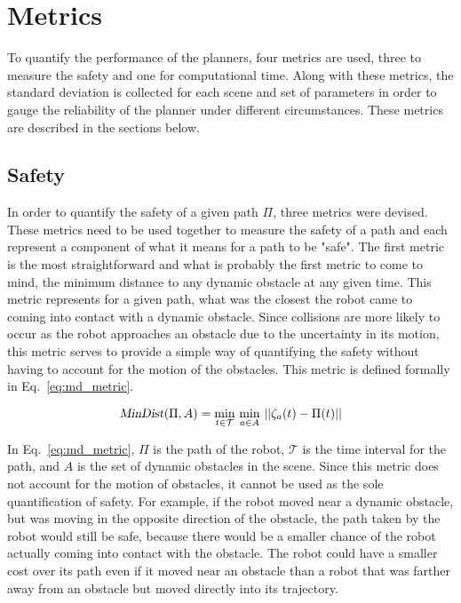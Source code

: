 \section{Metrics}

To quantify the performance of the planners, four metrics are used, three to
measure the safety and one for computational time. Along with these metrics,
the standard deviation is collected for each scene and set of parameters in
order to gauge the reliability of the planner under different circumstances.
These metrics are described in the sections below.

\subsection{Safety}

In order to quantify the safety of a given path $\Pi$, three metrics were
devised. These metrics need to be used together to measure the safety of a path
and each represent a component of what it means for a path to be "safe". The
first metric is the most straightforward and what is probably the first metric
to come to mind, the minimum distance to any dynamic obstacle at any given
time. This metric represents for a given path, what was the closest the robot
came to coming into contact with a dynamic obstacle. Since collisions are more
likely to occur as the robot approaches an obstacle due to the uncertainty in
its motion, this metric serves to provide a simple way of quantifying the
safety without having to account for the motion of the obstacles. This metric
is defined formally in Eq.~\ref{eq:md_metric}.

\begin{equation}
    \Var{MinDist}(\Pi, A) = \min_{t \in \mathcal{T}} \, \min_{a \in A} \,
    ||\zeta_a(t) - \Pi(t)||
    \label{eq:md_metric}
\end{equation}

In Eq.~\ref{eq:md_metric}, $\Pi$ is the path of the robot, $\mathcal{T}$ is the
time interval for the path, and $A$ is the set of dynamic obstacles in the
scene. Since this metric does not account for the motion of obstacles, it
cannot be used as the sole quantification of safety. For example, if the robot
moved near a dynamic obstacle, but was moving in the opposite direction of the
obstacle, the path taken by the robot would still be safe, because there would
be a smaller chance of the robot actually coming into contact with the
obstacle. The robot could have a smaller cost over its path even if it moved
near an obstacle than a robot that was farther away from an obstacle but moved
directly into its trajectory.

